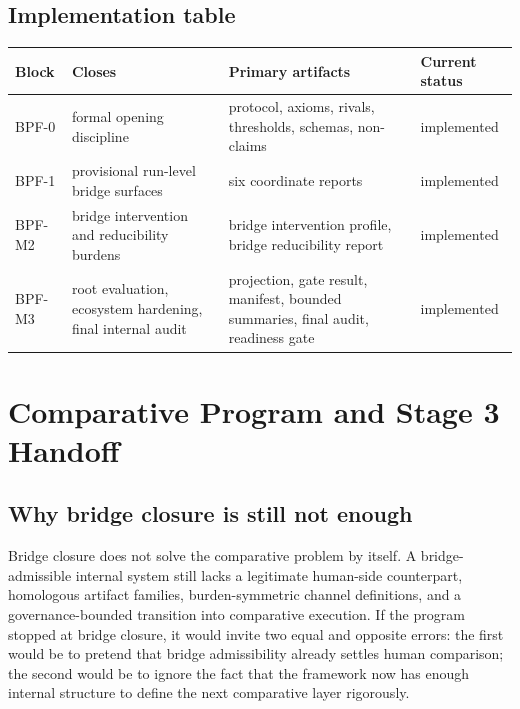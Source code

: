 \documentclass[11pt,a4paper]{article}
\theoremstyle{definition}
\begin{document}
\subsection{Implementation table}
\begin{center}
\renewcommand{\arraystretch}{1.15}
\setlength{\tabcolsep}{4pt}
\begin{tabularx}{\linewidth}{@{}lY Y Y@{}}
\toprule
Block & Closes & Primary artifacts & Current status \\
\midrule
BPF-0 & formal opening discipline & protocol, axioms, rivals, thresholds, schemas, non-claims & implemented \\
BPF-1 & provisional run-level bridge surfaces & six coordinate reports & implemented \\
BPF-M2 & bridge intervention and reducibility burdens & bridge intervention profile, bridge reducibility report & implemented \\
BPF-M3 & root evaluation, ecosystem hardening, final internal audit & projection, gate result, manifest, bounded summaries, final audit, readiness gate & implemented \\
\bottomrule
\end{tabularx}
\end{center}

\section{Comparative Program and Stage 3 Handoff}
\subsection{Why bridge closure is still not enough}
Bridge closure does not solve the comparative problem by itself. A bridge-admissible internal system still lacks a legitimate human-side counterpart, homologous artifact families, burden-symmetric channel definitions, and a governance-bounded transition into comparative execution. If the program stopped at bridge closure, it would invite two equal and opposite errors: the first would be to pretend that bridge admissibility already settles human comparison; the second would be to ignore the fact that the framework now has enough internal structure to define the next comparative layer rigorously.
\end{document}

